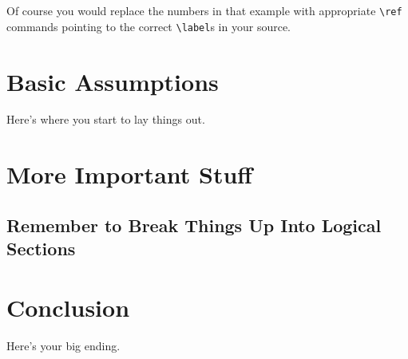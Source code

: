 \documentclass{icmmcm}
\begin{document}
Of course you would replace the numbers in that example with
appropriate \verb|\ref| commands pointing to the correct
\verb|\label|s in your source.


\section{Basic Assumptions}

Here's where you start to lay things out.


\section{More Important Stuff}

\subsection{Remember to Break Things Up Into Logical Sections}


\section{Conclusion}

Here's your big ending.






\end{document}
